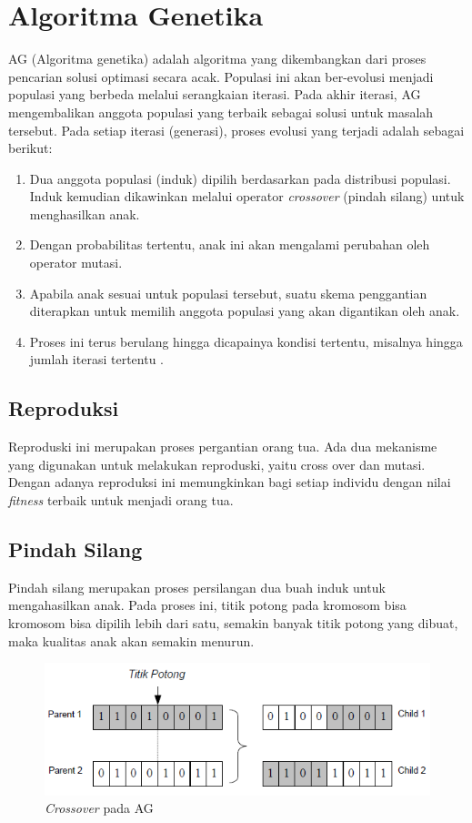 \documentclass[12pt,a4paper]{report}
\begin{document}
		\section{Algoritma Genetika}
		AG (Algoritma genetika) adalah algoritma yang dikembangkan dari proses pencarian solusi optimasi secara acak. Populasi ini akan ber-evolusi menjadi populasi yang berbeda melalui serangkaian iterasi. Pada akhir iterasi, AG mengembalikan anggota populasi yang terbaik sebagai solusi untuk masalah tersebut. Pada setiap iterasi (generasi), proses evolusi yang terjadi adalah sebagai berikut:
		\begin{enumerate}
			\item Dua anggota populasi (induk) dipilih berdasarkan pada distribusi populasi. Induk kemudian dikawinkan melalui operator \emph{crossover} (pindah silang) untuk menghasilkan anak.
			
			\item Dengan probabilitas tertentu, anak ini akan mengalami perubahan oleh operator mutasi.
			
			\item Apabila anak sesuai untuk populasi tersebut, suatu skema penggantian diterapkan untuk memilih anggota populasi yang akan digantikan oleh anak.
			
			\item Proses ini terus berulang hingga dicapainya kondisi tertentu, misalnya hingga jumlah iterasi tertentu \cite{Suyanto2007}.
		\end{enumerate}
		
		\subsection{Reproduksi}
		Reproduski ini merupakan proses pergantian orang tua. Ada dua mekanisme yang digunakan untuk melakukan reproduski, yaitu cross over dan mutasi. Dengan adanya reproduksi ini memungkinkan bagi setiap individu dengan nilai \emph{fitness} terbaik untuk menjadi orang tua.
		\subsection{Pindah Silang}
		Pindah silang merupakan proses persilangan dua buah induk untuk mengahasilkan anak. Pada proses ini, titik potong pada kromosom bisa kromosom bisa dipilih lebih dari satu, semakin banyak titik potong yang dibuat, maka kualitas anak akan semakin menurun.
		\begin{figure}[h]
		\centering
		\includegraphics[width=0.7\linewidth]{crossover}
		\caption{\emph{Crossover} pada AG}
		\label{fig:crossover}
		\end{figure}
\end{document}
